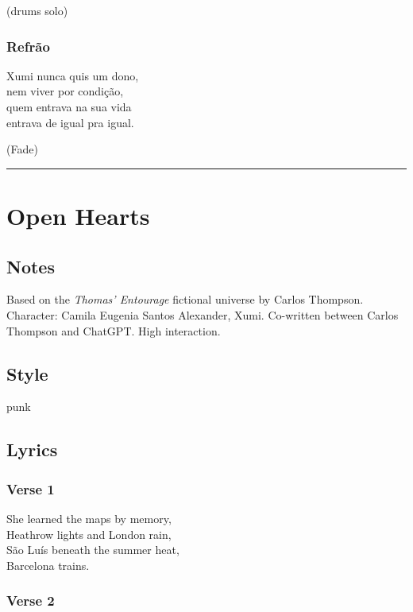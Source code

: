 (drums solo)

\subsubsection{Refrão}\label{refruxe3o-3}

Xumi nunca quis um dono,\\
nem viver por condição,\\
quem entrava na sua vida\\
entrava de igual pra igual.

(Fade)

\begin{center}\rule{0.5\linewidth}{0.5pt}\end{center}

\section{Open Hearts}\label{open-hearts}

\subsection{Notes}\label{notes-4}

Based on the \emph{Thomas' Entourage} fictional universe by Carlos
Thompson. Character: Camila Eugenia Santos Alexander, Xumi. Co-written
between Carlos Thompson and ChatGPT. High interaction.

\subsection{Style}\label{style-4}

punk

\subsection{Lyrics}\label{lyrics-4}

\subsubsection{Verse 1}\label{verse-1}

She learned the maps by memory,\\
Heathrow lights and London rain,\\
São Luís beneath the summer heat,\\
Barcelona trains.

\subsubsection{Verse 2}\label{verse-2}

